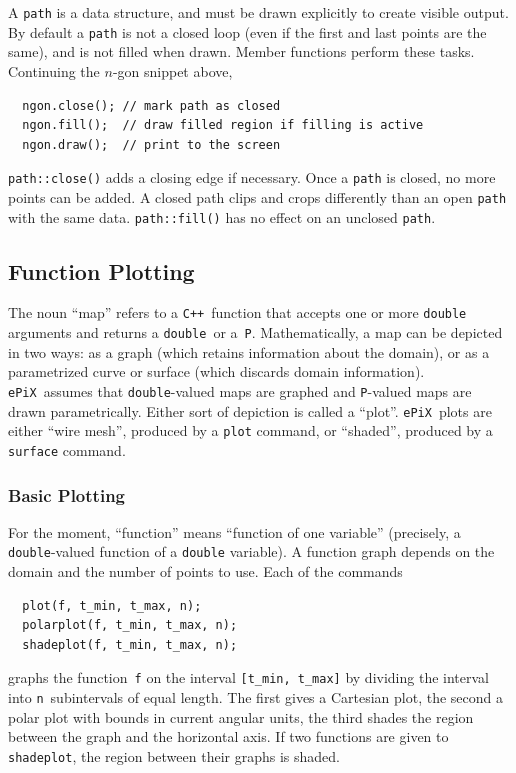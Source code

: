\documentclass[12pt,letterpaper]{book}
\newcommand{\code}[1]{\texttt{#1}}
\newcommand{\ePiX}{\code{ePiX}}
\newcommand{\CXX}{\code{C++}}
\newcommand{\teximath}[1]{$#1$}
\newcommand{\findex}[1]{\ignorespaces}
\begin{document}
A \code{path} is a data structure, and must be drawn explicitly to
create visible output. By default a \code{path} is not a closed loop
(even if the first and last points are the same), and is not filled
when drawn. Member functions perform these tasks. Continuing the
\teximath{n}-gon snippet above,
\findex{path.close}
\findex{path.fill}
\findex{path.draw}
\begin{verbatim}
  ngon.close(); // mark path as closed
  ngon.fill();  // draw filled region if filling is active
  ngon.draw();  // print to the screen
\end{verbatim}
\code{path::close()} adds a closing edge if necessary. Once a
\code{path} is closed, no more points can be added. A closed path
clips and crops differently than an open \code{path} with the same
data. \code{path::fill()} has no effect on an unclosed \code{path}.


\subsection{Function Plotting}

The noun ``map'' refers to a \CXX\ function that accepts one or
more \code{double} arguments and returns a \code{double}~or
a~\code{P}. Mathematically, a map can be depicted in two ways: as a
graph (which retains information about the domain), or as a
parametrized curve or surface (which discards domain
information). \ePiX\ assumes that \code{double}-valued maps are
graphed and \code{P}-valued maps are drawn parametrically. Either sort
of depiction is called a ``plot''.  \ePiX\ plots are either ``wire
mesh'', produced by a \code{plot} command, or ``shaded'', produced by
a \code{surface} command.


\subsubsection*{Basic Plotting}

For the moment, ``function'' means ``function of one variable''
(precisely, a \code{double}-valued function of a \code{double}
variable). A function graph depends on the domain and the number of
points to use. Each of the commands
\findex{plot}
\findex{polarplot}
\findex{shadeplot}
\begin{verbatim}
  plot(f, t_min, t_max, n);
  polarplot(f, t_min, t_max, n);
  shadeplot(f, t_min, t_max, n);
\end{verbatim}
graphs the function~\code{f} on the interval \code{[t\_min, t\_max]}
by dividing the interval into \code{n}~subintervals of equal length.
The first gives a Cartesian plot, the second a polar plot with bounds
in current angular units, the third shades the region between the
graph and the horizontal axis. If two functions are given to
\code{shadeplot}, the region between their graphs is shaded.
\end{document}
